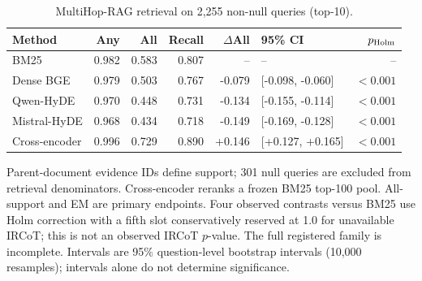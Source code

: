 \begin{table}[!htbp]
\centering\footnotesize
\caption{MultiHop-RAG retrieval on 2,255 non-null queries (top-10).}
\label{tab:mhrag_retrieval}
\begin{threeparttable}
\setlength{\tabcolsep}{3pt}
\begin{tabular}{lrrrrlr}
\toprule
Method & Any & All & Recall & $\Delta$All & 95\% CI & $p_{\rm Holm}$ \\
\midrule
BM25 & 0.982 & 0.583 & 0.807 & -- & -- & -- \\
Dense BGE & 0.979 & 0.503 & 0.767 & -0.079 & [-0.098, -0.060] & $<0.001$ \\
Qwen-HyDE & 0.970 & 0.448 & 0.731 & -0.134 & [-0.155, -0.114] & $<0.001$ \\
Mistral-HyDE & 0.968 & 0.434 & 0.718 & -0.149 & [-0.169, -0.128] & $<0.001$ \\
Cross-encoder & 0.996 & 0.729 & 0.890 & +0.146 & [+0.127, +0.165] & $<0.001$ \\
\bottomrule
\end{tabular}
\begin{tablenotes}\scriptsize\item Parent-document evidence IDs define support; 301 null queries are excluded from retrieval denominators. Cross-encoder reranks a frozen BM25 top-100 pool. All-support and EM are primary endpoints. Four observed contrasts versus BM25 use Holm correction with a fifth slot conservatively reserved at 1.0 for unavailable IRCoT; this is not an observed IRCoT $p$-value. The full registered family is incomplete. Intervals are 95\% question-level bootstrap intervals (10,000 resamples); intervals alone do not determine significance.
\end{tablenotes}
\end{threeparttable}
\end{table}

